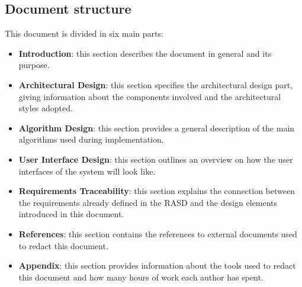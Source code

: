 	\subsection{Document structure}
		This document is divided in six main parts:
		\begin{itemize}
			\item \textbf{Introduction}: this section describes the document in general and its purpose.
			\item \textbf{Architectural Design}: this section specifies the architectural design part, giving information about the components involved and the architectural styles adopted.
			\item \textbf{Algorithm Design}: this section provides a general description of the main algorithms used during implementation.
			\item\textbf{User Interface Design}: this section outlines an overview on how the user interfaces of the system will look like. 
			\item \textbf{Requirements Traceability}: this section explains the connection between the requirements already defined in the RASD and the design elements introduced in this document.
			\item \textbf{References}: this section contains the references to external documents used to redact this document.
			\item \textbf{Appendix}: this section provides information about the tools used to redact this document and how many hours of work each author has spent. 
		\end{itemize}


%